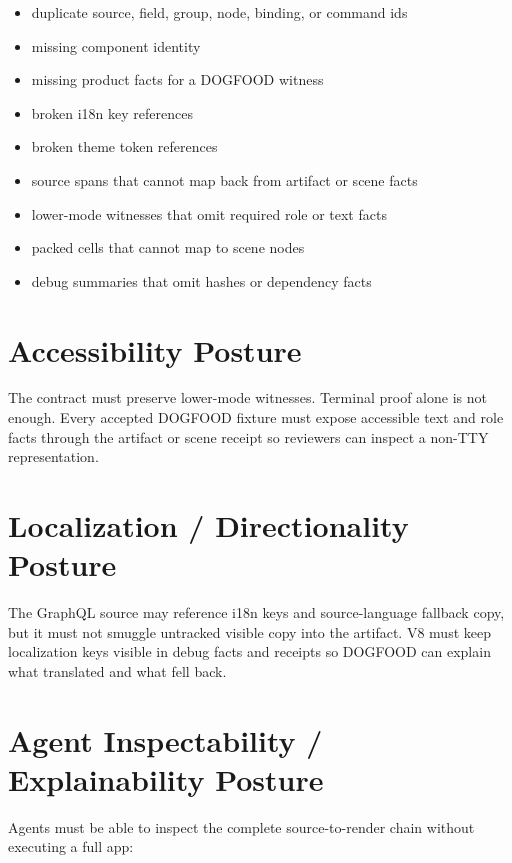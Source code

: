 \begin{itemize}
\tightlist
\item
  duplicate source, field, group, node, binding, or command ids
\item
  missing component identity
\item
  missing product facts for a DOGFOOD witness
\item
  broken i18n key references
\item
  broken theme token references
\item
  source spans that cannot map back from artifact or scene facts
\item
  lower-mode witnesses that omit required role or text facts
\item
  packed cells that cannot map to scene nodes
\item
  debug summaries that omit hashes or dependency facts
\end{itemize}

\section{Accessibility Posture}\label{record-144-accessibility-posture}

The contract must preserve lower-mode witnesses. Terminal proof alone is not enough. Every accepted DOGFOOD fixture must expose accessible text and role facts through the artifact or scene receipt so reviewers can inspect a non-TTY representation.

\section{Localization / Directionality Posture}\label{record-144-localization-directionality-posture}

The GraphQL source may reference i18n keys and source-language fallback copy, but it must not smuggle untracked visible copy into the artifact. V8 must keep localization keys visible in debug facts and receipts so DOGFOOD can explain what translated and what fell back.

\section{Agent Inspectability / Explainability Posture}\label{record-144-agent-inspectability-explainability-posture}

Agents must be able to inspect the complete source-to-render chain without executing a full app:

